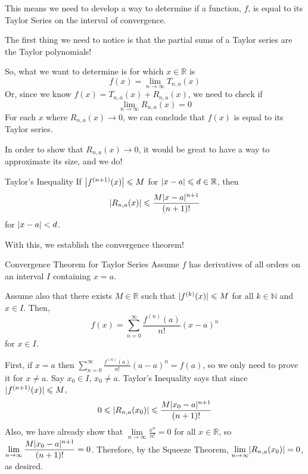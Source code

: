 This means we need to develop a way to determine if a function, $ f $,
is equal to its Taylor Series on the interval of convergence.

The first thing we need to notice is that the partial sums of a
Taylor series are the Taylor polynomials!

So, what we want to determine is for which $ x\in\mathbb{R} $ is
\[ f(x)=\lim\limits_{{n} \to {\infty}} T_{n,a}(x) \]
Or, since we know $ f(x)=T_{n,a}(x) + R_{n,a}(x) $,
we need to check if
\[ \lim\limits_{{n} \to {\infty}} R_{n,a}(x)=0 \]
For each $ x $ where $ R_{n,a}(x)\to 0 $, we can conclude that
$ f(x) $ is equal to its Taylor series.

In order to show that $ R_{n,a}(x)\to 0 $, it would be
great to have a way to approximate
its size, and we do!

\begin{Theorem}{Taylor's Inequality}{}
    If $ \abs*{f^{(n+1)}(x)}\leqslant M $ for $ \abs{x-a}\leqslant d\in\mathbb{R} $,
    then
    \[ \abs{R_{n,a}(x)}\leqslant \frac{M\abs{x-a}^{n+1}}{(n+1)!}  \]
    for $ \abs{x-a}<d $.
\end{Theorem}
With this, we establish the convergence theorem!
\begin{Theorem}{Convergence Theorem for Taylor Series}{}
    Assume $ f $ has derivatives of all orders on an interval
    $ I $ containing $ x=a $.

    Assume also that there exists $ M\in\mathbb{R} $ such that
    $ \abs{f^{(k)}(x)}\leqslant M $ for all $ k\in\mathbb{N} $
    and $ x\in I $. Then,
    \[ f(x)=\sum\limits_{n=0}^{\infty} \frac{f^{(n)}(a)}{n!}(x-a)^n \]
    for $ x\in I $.
\end{Theorem}

\begin{Proof}{}{}
    First, if $ x=a $ then $ \displaystyle \sum\limits_{n=0}^{\infty} \frac{f^{(n)}(a)}{n!}(a-a)^n
        =f(a) $, so we only need to prove it for $ x\neq a $. Say $ x_0\in I $,
    $ x_0\neq a $. Taylor's Inequality says that since $ \abs{f^{(n+1)}(x)}\leqslant M $,
    \[ 0\leqslant \abs{R_{n,a}(x_0)}\leqslant
        \frac{M\abs{x_0-a}^{n+1}}{(n+1)!} \]
    Also, we have already show that $ \displaystyle\lim\limits_{{n} \to {\infty}}\frac{x^n}{n!} =0 $
    for all $ x\in\mathbb{R} $, so $ \displaystyle\lim\limits_{{n} \to {\infty}}
        \frac{M\abs{x_0-a}^{n+1}}{(n+1)!} =0 $. Therefore, by the Squeeze Theorem,
    $ \lim\limits_{{n} \to {\infty}} \abs{R_{n,a}(x_0)}=0 $, as desired.
\end{Proof}

